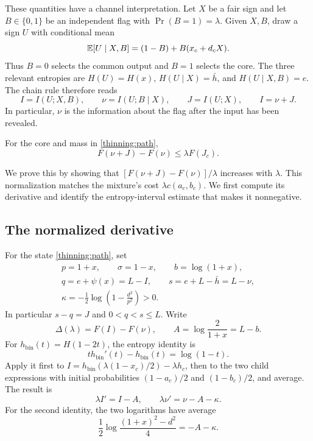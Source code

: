 These quantities have a channel interpretation.  Let $X$ be a fair
sign and let $B\in\{0,1\}$ be an independent flag with
$\Pr(B=1)=\lambda$.  Given $X,B$, draw a sign $U$ with conditional mean
\[
 \mathbb E[U\mid X,B]=(1-B)+B(x_c+d_cX).
\]
Thus $B=0$ selects the common output and $B=1$ selects the core.
The three relevant entropies are
$H(U)=H(x)$, $H(U\mid X)=\bar h$, and
$H(U\mid X,B)=e$.  The chain rule therefore reads
\begin{equation}
\label{thinning:flag-information}
 I=I(U;X,B),\qquad \nu=I(U;B\mid X),\qquad
 J=I(U;X),\qquad I=\nu+J.
\end{equation}
In particular, $\nu$ is the information about the flag after the
input has been revealed.

\begin{theorem}
\label{thinning:payment}
For the core and mass in \eqref{thinning:path},
\begin{equation}
\label{thinning:value}
 F(\nu+J)-F(\nu)\le\lambda F(J_c).
\end{equation}
\end{theorem}

We prove this by showing that $[F(\nu+J)-F(\nu)]/\lambda$
increases with $\lambda$. This normalization matches the mixture's
cost $\lambda c(a_c,b_c)$. We first compute its derivative and
identify the entropy-interval estimate that makes it nonnegative.

\subsection{The normalized derivative}

For the state \eqref{thinning:path}, set
\begin{equation}
\label{thinning:window-data}
 \begin{gathered}
 p=1+x,\qquad \sigma=1-x,\qquad b=\log(1+x),\\
 q=e+\psi(x)=L-I,\qquad s=e+L-\bar h=L-\nu,\\
 \kappa=-\frac12\log\left(1-\frac{d^2}{p^2}\right)>0.
 \end{gathered}
\end{equation}
In particular $s-q=J$ and $0<q<s\le L$. Write
\[
 \Delta(\lambda)=F(I)-F(\nu),\qquad
 A=\log\frac2{1+x}=L-b.
\]
For $h_{\mathrm{bin}}(t)=H(1-2t)$, the entropy identity is
\[
 t h_{\mathrm{bin}}'(t)-h_{\mathrm{bin}}(t)=\log(1-t).
\]
Apply it first to
$I=h_{\mathrm{bin}}(\lambda(1-x_c)/2)-\lambda h_c$,
then to the two child expressions with initial probabilities
$(1-a_c)/2$ and $(1-b_c)/2$, and average. The result is
\begin{equation}
\label{thinning:path-derivatives}
 \lambda I'=I-A,\qquad
 \lambda\nu'=\nu-A-\kappa.
\end{equation}
For the second identity, the two logarithms have average
\[
 \frac12\log\frac{(1+x)^2-d^2}{4}=-A-\kappa.
\]


